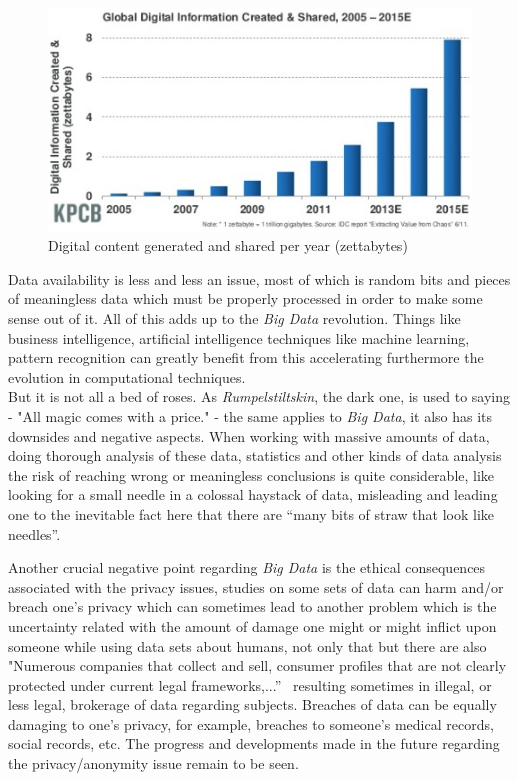 \documentclass{llncs}
\begin{document}
\begin{figure}[ht!]
\centering
\includegraphics[scale=0.65]{Digital_content_created.jpg}
\caption{Digital content generated and shared per year (zettabytes)~\cite{digitalInfo}}
\label{fig:minipage1}
\end{figure}

Data availability is less and less an issue, most of which is random bits and pieces of meaningless data which must be properly processed in order to make some sense out of it. All of this adds up to the \textit{Big Data} revolution. Things like business intelligence, artificial intelligence techniques like machine learning, pattern recognition can greatly benefit from this accelerating furthermore the evolution in computational techniques.\\

But it is not all a bed of roses. As \textit{Rumpelstiltskin}, the dark one, is used to saying - "All magic comes with a price." - the same applies to \textit{Big Data}, it also has its downsides and negative aspects. When working with massive amounts of data, doing thorough analysis of these data, statistics and other kinds of data analysis the risk of reaching wrong or meaningless conclusions is quite considerable, like looking for a small needle in a colossal haystack of data, misleading and leading one to the inevitable fact here that there are “many bits of straw that look like needles”.~\cite{Boyd2012}

Another crucial negative point regarding \textit{Big Data} is the ethical consequences associated with the privacy issues, studies on some sets of data can harm and/or breach one's privacy which can sometimes lead to another problem which is the uncertainty related with the amount of damage one might or might inflict upon someone while using data sets about humans, not only that but there are also "Numerous companies that collect and sell, consumer profiles that are not clearly protected under current legal frameworks,...”~\cite{Boyd2012} resulting sometimes in illegal, or less legal, brokerage of data regarding subjects. Breaches of data can be equally damaging to one's privacy, for example, breaches to someone's medical records, social records, etc. The progress and developments made in the future regarding the privacy/anonymity issue remain to be seen.~\cite{Boyd2012}~\cite{TaylorArmerding2014}~\cite{Lohr2012}
\end{document}
